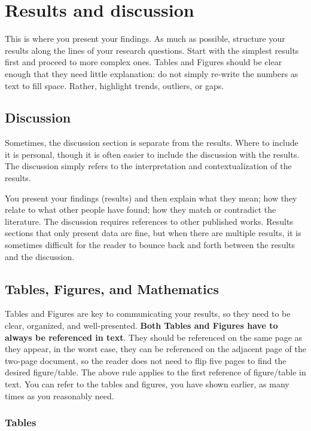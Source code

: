 \cleardoublepage%
\chapter{\label{chap:res}Results and discussion}%

This is where you present your findings. As much as possible, structure your results along the lines of your research questions. Start with the simplest results first and proceed to more complex ones. Tables and Figures should be clear enough that they need little explanation: do not simply re-write the numbers as text to fill space. Rather, highlight trends, outliers, or gaps. 

\section{\label{sec:res_disc}Discussion}

Sometimes, the discussion section is separate from the results. Where to include it is personal, though it is often easier to include the discussion with the results. The discussion simply refers to the interpretation and contextualization of the results.

You present your findings (results) and then explain what they mean;  how they relate to what other people have found;  how they match or contradict the literature. The discussion requires references to other published works. Results sections that only present data are fine, but when there are multiple results, it is sometimes difficult for the reader to bounce back and forth between the results and the discussion.

\section{\label{sec:res_tab_fig_math}Tables, Figures, and Mathematics}

Tables and Figures are key to communicating your results, so they need to be clear, organized, and well-presented. \textbf{Both Tables and Figures have to always be referenced in text}. They should be referenced on the same page as they appear, in the worst case, they can be referenced on the adjacent page of the two-page document, so the reader does not need to flip five pages to find the desired figure/table. The above rule applies to the first reference of figure/table in text. You can refer to the tables and figures, you have shown earlier, as many times as you reasonably need.

\subsection{\label{sec:res_tab}Tables}

